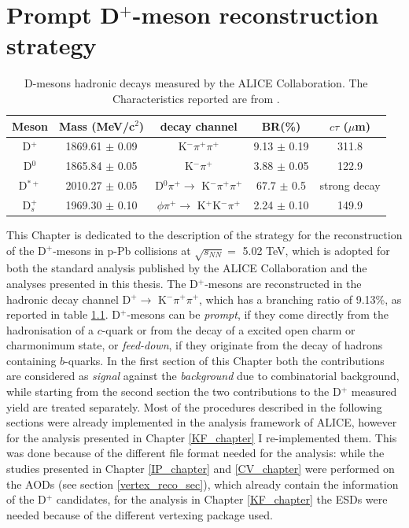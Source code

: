 \documentclass[b5paper,10pt,twoside,oldstyle,classica]{toptesi}
\begin{document}
\chapter{Prompt D$^+$-meson reconstruction strategy}
\label{Dplus_reco}
\begin{table}[b]
\centering 
\begin{center} %
\renewcommand\arraystretch{1.19} 
\begin{tabular}{|c|c|c|c|c|}
\hline
Meson & Mass (MeV/c$^2$) & decay channel & BR(\%) & $c\tau$ ($\mu$m) \\
\hline
D$^+$ & 1869.61 $\pm$ 0.09 & K$^-\pi^+\pi^+$ & 9.13 $\pm$ 0.19 & 311.8\\
D$^0$ & 1865.84 $\pm$ 0.05 & K$^-\pi^+$ & 3.88 $\pm$ 0.05 & 122.9\\
D$^{*+}$ & 2010.27 $\pm$ 0.05 & D$^0\pi^+ \rightarrow$ K$^-\pi^+\pi^+$ & 67.7 $\pm$ 0.5 & strong decay\\
D$_s^+$ & 1969.30 $\pm$ 0.10 & $\phi\pi^+ \rightarrow$ K$^+$K$^-\pi^+$ & 2.24 $\pm$ 0.10 & 149.9\\
\hline
\end{tabular}
\caption{D-mesons hadronic decays measured by the ALICE Collaboration. The Characteristics reported are from \cite{Agashe:2014kda}.}
\label{Dmesons_tab}
\end{center} 
\end{table}
This Chapter is dedicated to the description of the strategy for the reconstruction of the D$^+$-mesons in p-Pb collisions at $\sqrt{s_{NN}} =$ 5.02 TeV, which is adopted for both the standard analysis published by the ALICE Collaboration \cite{Abelev:2014hha} and the analyses presented in this thesis. The D$^+$-mesons are reconstructed in the hadronic decay channel D$^+\rightarrow $ K$^-\pi^+\pi^+$, which has a branching ratio of 9.13\%, as reported in table \ref{Dmesons_tab}. D$^+$-mesons can be \textit{prompt}, if they come directly from the hadronisation of a $c$-quark or from the decay of a excited open charm or charmonimum state, or \textit{feed-down}, if they originate from the decay of hadrons containing $b$-quarks. In the first section of this Chapter both the contributions are considered as \textit{signal} against the \textit{background} due to combinatorial background, while starting from the second section the two contributions to the D$^+$ measured yield are treated separately. Most of the procedures described in the following sections were already implemented in the analysis framework of ALICE, however for the analysis presented in Chapter \ref{KF_chapter} I re-implemented them. This was done because of the different file format needed for the analysis: while the studies presented in Chapter \ref{IP_chapter} and \ref{CV_chapter} were performed on the AODs (see section \ref{vertex_reco_sec}), which already contain the information of the D$^+$ candidates, for the analysis in Chapter \ref{KF_chapter} the ESDs were needed because of the different vertexing package used.
\end{document}
